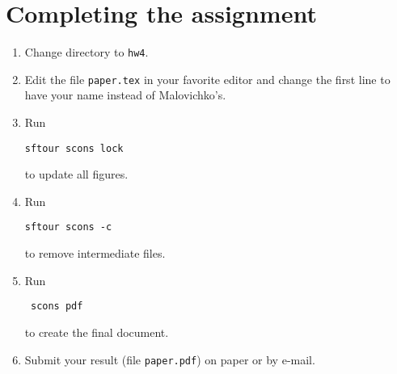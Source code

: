 \section{Completing the assignment}

\begin{enumerate}
\item Change directory to \verb#hw4#.
\item Edit the file \texttt{paper.tex} in your favorite editor and change the
  first line to have your name instead of Malovichko's.
\item Run
\begin{verbatim}
sftour scons lock
\end{verbatim}
to update all figures.
\item Run
\begin{verbatim}
sftour scons -c
\end{verbatim}
to remove intermediate files.
\item Run
 \begin{verbatim} 
 scons pdf
\end{verbatim}
  to create the final document.
\item Submit your result (file \texttt{paper.pdf}) on paper or by
  e-mail. 
\end{enumerate}